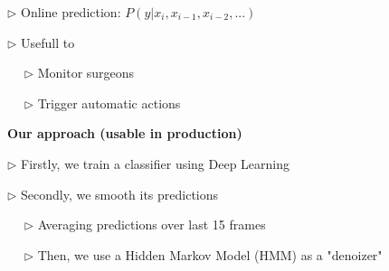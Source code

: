 \documentclass[landscape,a0paper,fontscale=0.292]{baposter}
\begin{document}
\begin{poster}
{\vspace{1mm}

$\triangleright$ Online prediction: $P(y | x_i, x_{i-1}, x_{i-2}, ...)$
 

$\triangleright$ Usefull to

~~ $\triangleright$ Monitor surgeons

~~ $\triangleright$ Trigger automatic actions


\vspace{2mm}
\textbf{Our approach (usable in production)}

$\triangleright$ Firstly, we train a classifier using Deep Learning

$\triangleright$ Secondly, we smooth its predictions 

~~ $\triangleright$ Averaging predictions over last 15 frames

~~ $\triangleright$ Then, we use a Hidden Markov Model (HMM) as a "denoizer"

}

% 
% 
% 
% 
% 
% 
% 
% 
% 

\end{poster}
\end{document}
